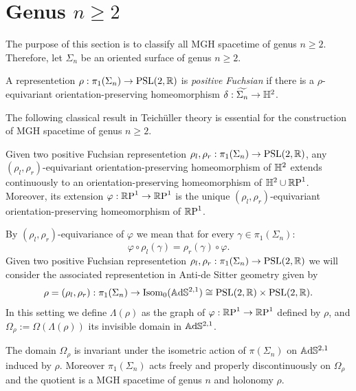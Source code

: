\section{Genus $n\geq 2$}
The purpose of this section is to classify all MGH spacetime of genus $n\geq 2$. Therefore, let $\Sigma_n$ be an oriented surface of genus $n\geq 2$.
\begin{definition}
    A representetion $\rho: \pi_1(\Sigma_n) \to \PSL$ is \textit{positive Fuchsian} if there is a $\rho$-equivariant orientation-preserving homeomorphism $\delta : \widetilde{\Sigma_n}\to\H^2$.
\end{definition}
The following classical result in Teich\"uller theory is essential for the construction of MGH spacetime of genus $n\geq 2$.
\begin{lemma}
    Given two positive Fuchsian representetion $\rho_l, \rho_r : \pi_1(\Sigma_n) \to \PSL$, any $(\rho_l, \rho_r)$-equivariant orientation-preserving homeomorphism of $\H^2$ extends continuously to an orientation-preserving homeomorphism of $\H^2\cup\S$. Moreover, its extension $\varphi : \S\to\S$ is the unique $(\rho_l, \rho_r)$-equivariant orientation-preserving homeomorphism of $\S$.
\end{lemma}
By $(\rho_l, \rho_r)$-equivariance of $\varphi$ we mean that for every $\gamma \in \pi_1(\Sigma_n)$:
\begin{equation} \label{eq:equivariance}
    \varphi \circ \rho_l(\gamma) = \rho_r(\gamma)\circ\varphi.
\end{equation}
Given two positive Fuchsian representetion $\rho_l, \rho_r : \pi_1(\Sigma_n) \to \PSL$ we will consider the associated representetion in Anti-de Sitter geometry given by
\[
    \rho = (\rho_l, \rho_r) : \pi_1(\Sigma_n) \to \text{Isom}_0(\A^{2,1}) \cong \PSL \times \PSL.
\]
In this setting we define $\Lambda(\rho)$ as the graph of $\varphi: \S\to\S$ defined by $\rho$, and $\Omega_\rho := \Omega(\Lambda(\rho))$ its invisible domain in $\A^{2,1}$.
\begin{proposition} \label{prop:MGH_example}
    The domain $\Omega_\rho$ is invariant under the isometric action of $\pi(\Sigma_n)$ on $\A^{2,1}$ induced by $\rho$. Moreover $\pi_1(\Sigma_n)$ acts freely and properly discontinuously on $\Omega_\rho$ and the quotient is a MGH spacetime of genus $n$ and holonomy $\rho$.
\end{proposition}
